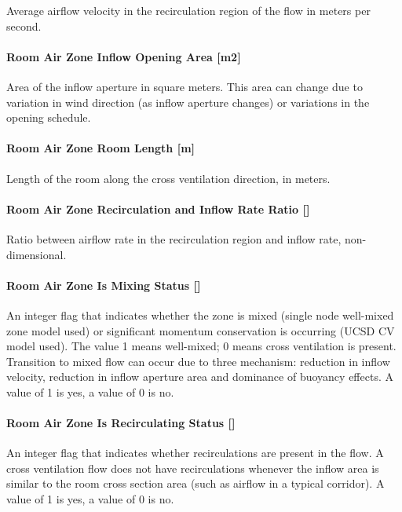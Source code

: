 Average airflow velocity in the recirculation region of the flow in meters per second.

\paragraph{Room Air Zone Inflow Opening Area {[}m2{]}}\label{room-air-zone-inflow-opening-area-m2-1}

Area of the inflow aperture in square meters. This area can change due to variation in wind direction (as inflow aperture changes) or variations in the opening schedule.

\paragraph{Room Air Zone Room Length {[}m{]}}\label{room-air-zone-room-length-m-1}

Length of the room along the cross ventilation direction, in meters.

\paragraph{Room Air Zone Recirculation and Inflow Rate Ratio {[]}}\label{room-air-zone-recirculation-and-inflow-rate-ratio-1}

Ratio between airflow rate in the recirculation region and inflow rate, non-dimensional.

\paragraph{Room Air Zone Is Mixing Status {[]}}\label{room-air-zone-is-mixing-status-1}

An integer flag that indicates whether the zone is mixed (single node well-mixed zone model used) or significant momentum conservation is occurring (UCSD CV model used). The value 1 means well-mixed; 0 means cross ventilation is present. Transition to mixed flow can occur due to three mechanism: reduction in inflow velocity, reduction in inflow aperture area and dominance of buoyancy effects. A value of 1 is yes, a value of 0 is no.

\paragraph{Room Air Zone Is Recirculating Status {[]}}\label{room-air-zone-is-recirculating-status-1}

An integer flag that indicates whether recirculations are present in the flow. A cross ventilation flow does not have recirculations whenever the inflow area is similar to the room cross section area (such as airflow in a typical corridor). A value of 1 is yes, a value of 0 is no.


